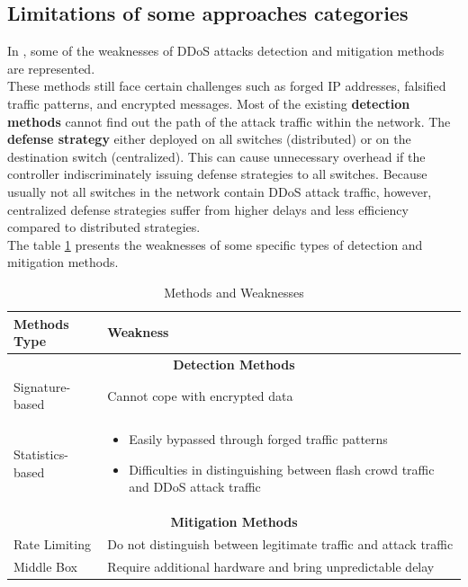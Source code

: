 \subsection{Limitations of some approaches categories}
In \cite{stgcn}, some of the weaknesses of DDoS attacks detection and mitigation methods are represented. \\
These methods still face certain challenges such as forged IP addresses, falsified traffic patterns, and encrypted messages. Most of the existing \textbf{detection methods} cannot find out the path of the attack traffic within the network.
The \textbf{defense strategy} either deployed on all switches (distributed) or on the destination switch (centralized). This can cause unnecessary overhead if the controller indiscriminately issuing defense strategies to all switches. Because usually not all switches in the network contain DDoS attack traffic, however, centralized defense strategies suffer from higher delays and less efficiency compared to distributed strategies.\\

The table \ref{tab:limits} presents the weaknesses of some specific types of detection and mitigation methods.

\begin{table}[H]
\centering
\begin{tabular}{|l|p{8cm}|}
\hline
\textbf{Methods Type} & \textbf{Weakness} \\
\hline
\multicolumn{2}{|c|}{\textbf{Detection Methods}} \\
\hline
 Signature-based & Cannot cope with encrypted data \\
\hline
\quad Statistics-based & 
  \begin{itemize}
    \item Easily bypassed through forged traffic patterns
    \item Difficulties in distinguishing between flash crowd traffic and DDoS attack traffic
  \end{itemize} \\
\hline
\multicolumn{2}{|c|}{\textbf{Mitigation Methods}} \\
\hline
Rate Limiting & Do not distinguish between legitimate traffic and attack traffic \\
\hline
Middle Box & Require additional hardware and bring unpredictable delay \\
\hline
\end{tabular}
\caption{Methods and Weaknesses}
\label{tab:limits}
\end{table}



